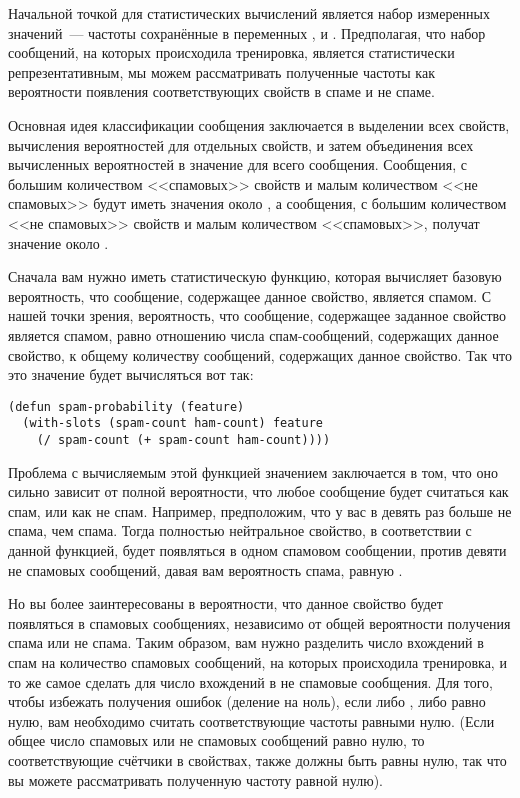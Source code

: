 Начальной точкой для статистических вычислений является набор измеренных значений~---
частоты сохранённые в переменных ,  и
.  Предполагая, что набор сообщений, на которых происходила тренировка,
является статистически репрезентативным, мы можем рассматривать полученные частоты как
вероятности появления соответствующих свойств в спаме и не спаме.

Основная идея классификации сообщения заключается в выделении всех свойств, вычисления
вероятностей для отдельных свойств, и затем объединения всех вычисленных вероятностей в
значение для всего сообщения.  Сообщения, с большим количеством <<спамовых>> свойств и малым
количеством <<не спамовых>> будут иметь значения около , а сообщения, с большим
количеством <<не спамовых>> свойств и малым количеством <<спамовых>>, получат значение около
.

Сначала вам нужно иметь статистическую функцию, которая вычисляет базовую вероятность, что
сообщение, содержащее данное свойство, является спамом.  С нашей точки зрения,
вероятность, что сообщение, содержащее заданное свойство является спамом, равно отношению
числа спам-сообщений, содержащих данное свойство, к общему количеству сообщений,
содержащих данное свойство.  Так что это значение будет вычисляться вот так:

\begin{lstlisting}
(defun spam-probability (feature)
  (with-slots (spam-count ham-count) feature
    (/ spam-count (+ spam-count ham-count))))
\end{lstlisting}

Проблема с вычисляемым этой функцией значением заключается в том, что оно сильно зависит
от полной вероятности, что любое сообщение будет считаться как спам, или как не спам.
Например, предположим, что у вас в девять раз больше не спама, чем спама.  Тогда полностью
нейтральное свойство, в соответствии с данной функцией, будет появляться в одном спамовом
сообщении, против девяти не спамовых сообщений, давая вам вероятность спама, равную
.

Но вы более заинтересованы в вероятности, что данное свойство будет появляться в спамовых
сообщениях, независимо от общей вероятности получения спама или не спама.  Таким образом,
вам нужно разделить число вхождений в спам на количество спамовых сообщений, на которых
происходила тренировка, и то же самое сделать для число вхождений в не спамовые сообщения.
Для того, чтобы избежать получения ошибок  (деление на ноль), если
либо , либо  равно нулю, вам необходимо считать
соответствующие частоты равными нулю. (Если общее число спамовых или не спамовых сообщений
равно нулю, то соответствующие счётчики в свойствах, также должны быть равны нулю, так что
вы можете рассматривать полученную частоту равной нулю).

